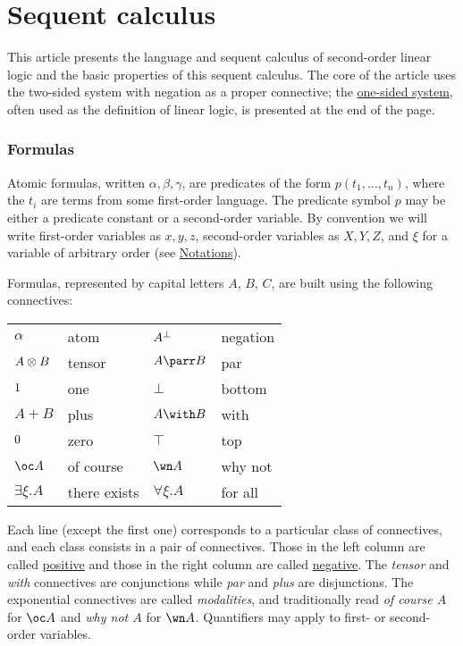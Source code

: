 \chapter{Sequent calculus}\label{sequent-calculus}

This article presents the language and sequent calculus of second-order
linear logic and the basic properties of this sequent calculus. The core
of the article uses the two-sided system with negation as a proper
connective; the \protect\hyperlink{One-sided_sequent_calculus}{one-sided
system}, often used as the definition of linear logic, is presented at
the end of the page.

\subsection{Formulas}\label{formulas}

Atomic formulas, written \(\alpha,\beta,\gamma\), are predicates of the
form \(p(t_1,\ldots,t_n)\), where the \(t_i\) are terms from some
first-order language. The predicate symbol \(p\) may be either a
predicate constant or a second-order variable. By convention we will
write first-order variables as \(x,y,z\), second-order variables as
\(X,Y,Z\), and \(\xi\) for a variable of arbitrary order (see
\url{Notations}).

Formulas, represented by capital letters \(A\), \(B\), \(C\), are built
using the following connectives:

\begin{longtable}[]{@{}llll@{}}
\toprule
\(\alpha\) & atom & \(A^\bot\) & negation\tabularnewline
\(A \otimes B\) & tensor & \(A \parr B\) & par\tabularnewline
\(1\) & one & \(\bot\) & bottom\tabularnewline
\(A \plus B\) & plus & \(A \with B\) & with\tabularnewline
\(0\) & zero & \(\top\) & top\tabularnewline
\(\oc A\) & of course & \(\wn A\) & why not\tabularnewline
\(\exists \xi.A\) & there exists & \(\forall \xi.A\) & for
all\tabularnewline
\bottomrule
\end{longtable}

Each line (except the first one) corresponds to a particular class of
connectives, and each class consists in a pair of connectives. Those in
the left column are called \href{positive_formula}{positive} and those
in the right column are called \href{negative_formula}{negative}. The
\emph{tensor} and \emph{with} connectives are conjunctions while
\emph{par} and \emph{plus} are disjunctions. The exponential connectives
are called \emph{modalities}, and traditionally read \emph{of course
\(A\)} for \(\oc A\) and \emph{why not \(A\)} for \(\wn A\). Quantifiers
may apply to first- or second-order variables.

